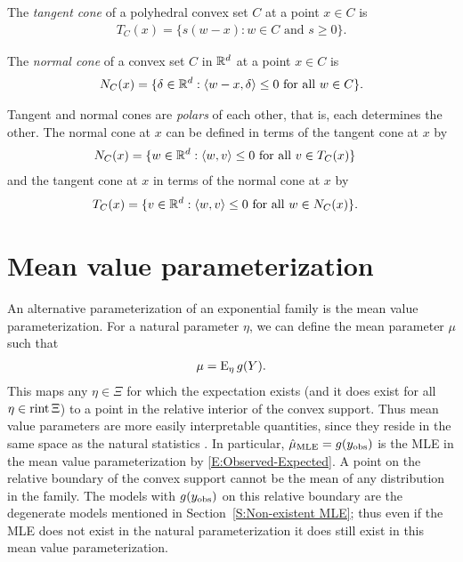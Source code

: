 The \emph{tangent cone} of a polyhedral convex set $C$ at a point $x \in C$ is
\begin{align*}
	T_C(x) = \{s(w-x):w \in C \text{ and } s \geq 0 \}.
\end{align*}


The \emph{normal cone} of a convex set $C$ in ${\mathbb R}^d$ at a point $x \in C$ is 
\begin{align*}
	N_C(x) = \{ \delta \in {\mathbb R}^d: \langle w-x,\delta \rangle \leq 0 \text{ for all } w \in C 
\}.
\end{align*}

Tangent and normal cones are \emph{polars} of each other, that is, each determines the other.  
The normal cone at $x$ can be defined in terms of the tangent cone at $x$ by
\begin{align*}
	N_C(x) 	&= \{ w \in {\mathbb R}^d: \langle  w, v  \rangle \leq 0 \text{ for all } v \in T_C(x) \} 
\end{align*}
and the tangent cone at $x$ in terms of the normal cone at $x$ by
\begin{align*}
	T_C(x) 	&= \{ v \in {\mathbb R}^d: \langle  w, v  \rangle \leq 0 \text{ for all } w \in N_C(x) \}.
\end{align*}



\section{Mean value parameterization} \label{S:Mean value parameterization}
An alternative parameterization of an exponential family is the mean value 
parameterization.  For a natural parameter $\eta$, we can define the mean parameter 
$\mu$ such that
\begin{align*}
	\mu = \operatorname{E}_\eta g(Y).
\end{align*}
This maps any $\eta \in \Xi$ for which the expectation exists 
(and it does exist for all $\eta \in \operatorname{rint} \Xi$)
to a point in
the relative interior of the convex support.
Thus mean value parameters are more easily interpretable quantities, since
they reside in the same space as the natural statistics 
\citep{Handcock:degeneracy,Rinaldo:2009}.
In particular, $\hat{\mu}_{\textrm{MLE}} = g(y_{\text{obs}})$ is the MLE in the mean value parameterization
by \eqref{E:Observed-Expected}.  
A point on the 
relative boundary of the convex support cannot be the mean of any distribution
in the family.  The models with $g(y_{\text{obs}})$ on this relative boundary
are the degenerate models mentioned in Section~\ref{S:Non-existent MLE};
thus even if the MLE does not exist in the natural parameterization it does 
still exist in this mean value parameterization.

